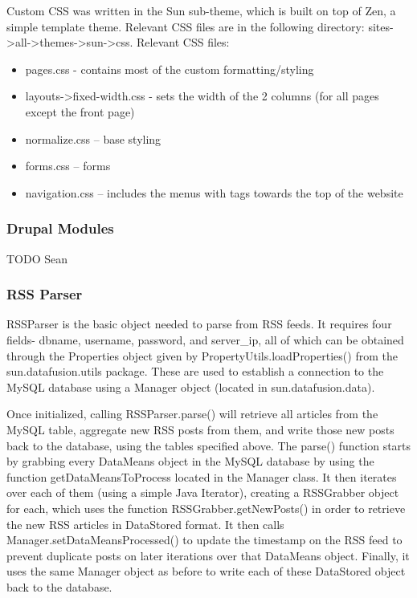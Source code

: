 \documentclass[11pt]{article} %
\begin{document}
Custom CSS was written in the Sun sub-theme, which is built on top of Zen, a simple template theme. Relevant CSS files are in the following directory: sites-\textgreater all-\textgreater themes-\textgreater sun-\textgreater css.
Relevant CSS files:

\begin{itemize}
\item pages.css - contains most of the custom formatting/styling
\item layouts->fixed-width.css - sets the width of the 2 columns (for all pages except the front page)
\item normalize.css – base styling
\item forms.css – forms
\item navigation.css – includes the menus with tags towards the top of the website
\end{itemize}

\subsubsection{Drupal Modules}

TODO Sean

\subsubsection{RSS Parser}

RSSParser is the basic object needed to parse from RSS feeds. It requires four fields- dbname, username, password, and server\_ip, all of which can be obtained through the Properties object given by PropertyUtils.loadProperties() from the sun.datafusion.utils package. These are used to establish a connection to the MySQL database using a Manager object (located in sun.datafusion.data).

Once initialized, calling RSSParser.parse() will retrieve all articles from the MySQL table, aggregate new RSS posts from them, and write those new posts back to the database, using the tables specified above. The parse() function starts by grabbing every DataMeans object in the MySQL database by using the function getDataMeansToProcess located in the Manager class. It then iterates over each of them (using a simple Java Iterator), creating a RSSGrabber object for each, which uses the function RSSGrabber.getNewPosts() in order to retrieve the new RSS articles in DataStored format. It then calls Manager.setDataMeansProcessed() to update the timestamp on the RSS feed to prevent duplicate posts on later iterations over that DataMeans object. Finally, it uses the same Manager object as before to write each of these DataStored object back to the database.
\end{document}
